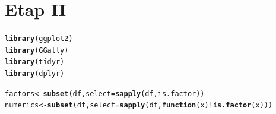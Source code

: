 \documentclass{article}\usepackage[]{graphicx}\usepackage[]{color}
\makeatletter
\newcommand{\hlopt}[1]{\textcolor[rgb]{0,0,0}{#1}}%
\newcommand{\hlstd}[1]{\textcolor[rgb]{0.345,0.345,0.345}{#1}}%
\newcommand{\hlkwa}[1]{\textcolor[rgb]{0.161,0.373,0.58}{\textbf{#1}}}%
\newcommand{\hlkwb}[1]{\textcolor[rgb]{0.69,0.353,0.396}{#1}}%
\newcommand{\hlkwc}[1]{\textcolor[rgb]{0.333,0.667,0.333}{#1}}%
\newcommand{\hlkwd}[1]{\textcolor[rgb]{0.737,0.353,0.396}{\textbf{#1}}}%
\newenvironment{kframe}{%
 \def\at@end@of@kframe{}%
 \ifinner\ifhmode%
  \def\at@end@of@kframe{\end{minipage}}%
  \begin{minipage}{\columnwidth}%
 \fi\fi%
 \def\FrameCommand##1{\hskip\@totalleftmargin \hskip-\fboxsep
 \colorbox{shadecolor}{##1}\hskip-\fboxsep
     \hskip-\linewidth \hskip-\@totalleftmargin \hskip\columnwidth}%
 \MakeFramed {\advance\hsize-\width
   \@totalleftmargin\z@ \linewidth\hsize
   \@setminipage}}%
 {\par\unskip\endMakeFramed%
 \at@end@of@kframe}
\newenvironment{knitrout}{}{} %
\makeatother
\begin{document}
\section{Etap II}

\begin{knitrout}
\color{fgcolor}\begin{kframe}
\begin{alltt}
\hlkwd{library}\hlstd{(ggplot2)}
\hlkwd{library}\hlstd{(GGally)}
\hlkwd{library}\hlstd{(tidyr)}
\hlkwd{library}\hlstd{(dplyr)}
\end{alltt}
\end{kframe}
\end{knitrout}

\begin{knitrout}
\color{fgcolor}\begin{kframe}
\begin{alltt}
\hlstd{factors} \hlkwb{<-} \hlkwd{subset}\hlstd{(df,} \hlkwc{select}\hlstd{=}\hlkwd{sapply}\hlstd{(df, is.factor))}
\hlstd{numerics} \hlkwb{<-} \hlkwd{subset}\hlstd{(df,} \hlkwc{select}\hlstd{=}\hlkwd{sapply}\hlstd{(df,} \hlkwa{function}\hlstd{(}\hlkwc{x}\hlstd{)} \hlopt{!}\hlkwd{is.factor}\hlstd{(x)))}
\end{alltt}
\end{kframe}
\end{knitrout}
\end{document}
